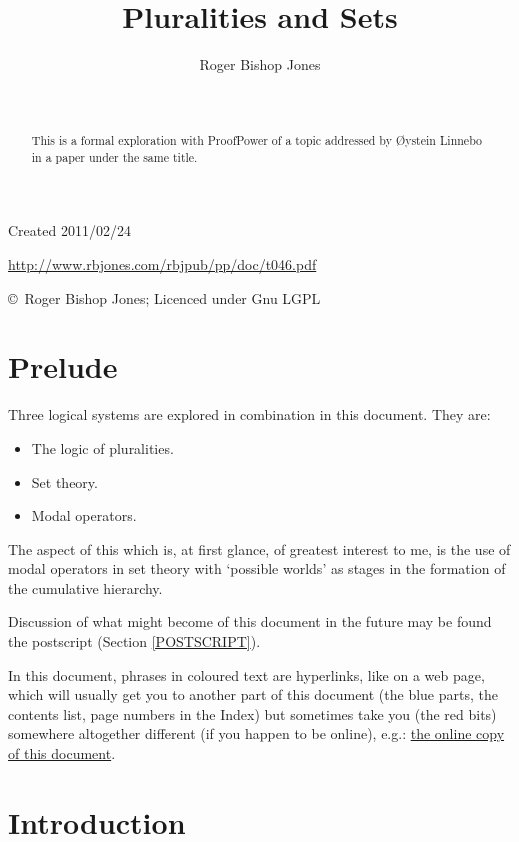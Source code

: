 \documentclass[11pt]{article}
\title{Pluralities and Sets}
\author{Roger Bishop Jones}
\date{\ }
\begin{document}
\begin{titlepage}
\maketitle
\begin{abstract}
This is a formal exploration with ProofPower of a topic addressed by {\O}ystein Linnebo in a paper under the same title.
\end{abstract}
\vfill

\begin{centering}
{\footnotesize

Created 2011/02/24



\href{http://www.rbjones.com/rbjpub/pp/doc/t046.pdf}
{http://www.rbjones.com/rbjpub/pp/doc/t046.pdf}

\copyright\ Roger Bishop Jones; Licenced under Gnu LGPL

}%
\end{centering}

\thispagestyle{empty}
\end{titlepage}

\newpage
\addtocounter{page}{1}
{\parskip=0pt\tableofcontents}

\section{Prelude}

Three logical systems are explored in combination in this document.
They are:

\begin{itemize}
\item The logic of pluralities.
\item Set theory.
\item Modal operators.
\end{itemize}

The aspect of this which is, at first glance, of greatest interest to me, is the use of modal operators in set theory with `possible worlds' as stages in the formation of the cumulative hierarchy.

Discussion of what might become of this document in the future may be found the postscript (Section \ref{POSTSCRIPT}).

In this document, phrases in coloured text are hyperlinks, like on a web page, which will usually get you to another part of this document (the blue parts, the contents list, page numbers in the Index) but sometimes take you (the red bits) somewhere altogether different (if you happen to be online), e.g.: \href{http://rbjones.com/rbjpub/pp/doc/t046.pdf}{the online copy of this document}.

\section{Introduction}
\end{document}
